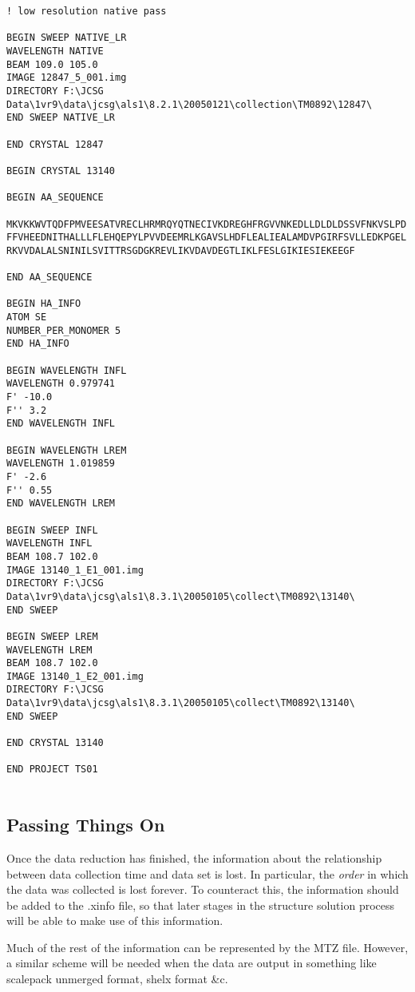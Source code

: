 \documentclass[a4paper, 11pt]{article}
\begin{document}
{\begin{verbatim}
! low resolution native pass

BEGIN SWEEP NATIVE_LR
WAVELENGTH NATIVE
BEAM 109.0 105.0
IMAGE 12847_5_001.img
DIRECTORY F:\JCSG Data\1vr9\data\jcsg\als1\8.2.1\20050121\collection\TM0892\12847\
END SWEEP NATIVE_LR

END CRYSTAL 12847

BEGIN CRYSTAL 13140

BEGIN AA_SEQUENCE

MKVKKWVTQDFPMVEESATVRECLHRMRQYQTNECIVKDREGHFRGVVNKEDLLDLDLDSSVFNKVSLPD
FFVHEEDNITHALLLFLEHQEPYLPVVDEEMRLKGAVSLHDFLEALIEALAMDVPGIRFSVLLEDKPGEL
RKVVDALALSNINILSVITTRSGDGKREVLIKVDAVDEGTLIKLFESLGIKIESIEKEEGF

END AA_SEQUENCE

BEGIN HA_INFO
ATOM SE
NUMBER_PER_MONOMER 5
END HA_INFO

BEGIN WAVELENGTH INFL
WAVELENGTH 0.979741
F' -10.0
F'' 3.2
END WAVELENGTH INFL

BEGIN WAVELENGTH LREM
WAVELENGTH 1.019859
F' -2.6
F'' 0.55
END WAVELENGTH LREM

BEGIN SWEEP INFL
WAVELENGTH INFL
BEAM 108.7 102.0
IMAGE 13140_1_E1_001.img
DIRECTORY F:\JCSG Data\1vr9\data\jcsg\als1\8.3.1\20050105\collect\TM0892\13140\
END SWEEP

BEGIN SWEEP LREM
WAVELENGTH LREM
BEAM 108.7 102.0
IMAGE 13140_1_E2_001.img
DIRECTORY F:\JCSG Data\1vr9\data\jcsg\als1\8.3.1\20050105\collect\TM0892\13140\
END SWEEP

END CRYSTAL 13140

END PROJECT TS01


\end{verbatim}
}

\subsection{Passing Things On}

Once the data reduction has finished, the information about the relationship
between data collection time and data set is lost. In particular, the
\emph{order} in which the data was collected is lost forever. To counteract
this, the information should be added to the .xinfo file, so that later
stages in the structure solution process will be able to make use of this 
information.

Much of the rest of the information can be represented by the MTZ file.
However, a similar scheme will be needed when the data are output in 
something like scalepack unmerged format, shelx format \&c.
\end{document}
